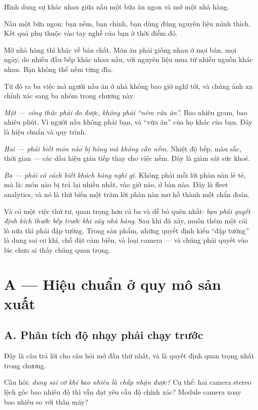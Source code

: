 \documentclass[../../vslam.tex]{subfiles}
\begin{document}
\begin{trucgiac}
Hình dung sự khác nhau giữa nấu một bữa ăn ngon và mở một nhà hàng.

Nấu một bữa ngon: bạn nếm, bạn chỉnh, bạn dùng đúng nguyên liệu mình thích. Kết quả phụ thuộc vào tay nghề của bạn ở thời điểm đó.

Mở nhà hàng thì khác về bản chất. Món ăn phải giống nhau ở mọi bàn, mọi ngày, do nhiều đầu bếp khác nhau nấu, với nguyên liệu mua từ nhiều nguồn khác nhau. Bạn không thể nếm từng đĩa.

Từ đó ra ba việc mà người nấu ăn ở nhà không bao giờ nghĩ tới, và chúng ánh xạ chính xác sang ba nhóm trong chương này.

\emph{Một --- công thức phải đo được, không phải ``nêm vừa ăn''.} Bao nhiêu gram, bao nhiêu phút. Vì người nấu không phải bạn, và ``vừa ăn'' của họ khác của bạn. Đây là hiệu chuẩn và quy trình.

\emph{Hai --- phải biết món nào bị hỏng mà không cần nếm.} Nhiệt độ bếp, màu sắc, thời gian --- các dấu hiệu gián tiếp thay cho việc nếm. Đây là giám sát sức khoẻ.

\emph{Ba --- phải có cách biết khách hàng nghĩ gì.} Không phải mỗi lời phàn nàn lẻ tẻ, mà là: món nào bị trả lại nhiều nhất, vào giờ nào, ở bàn nào. Đây là fleet analytics, và nó là thứ biến một trăm lời phàn nàn mơ hồ thành một chẩn đoán.

Và có một việc thứ tư, quan trọng hơn cả ba và dễ bỏ quên nhất: \emph{bạn phải quyết định kích thước bếp trước khi xây nhà hàng}. Sau khi đã xây, muốn thêm một cái lò nữa thì phải đập tường. Trong sản phẩm, những quyết định kiểu ``đập tường'' là dung sai cơ khí, chỗ đặt cảm biến, và loại camera --- và chúng phải quyết vào lúc chưa ai thấy chúng quan trọng.
\end{trucgiac}

\section{A --- Hiệu chuẩn ở quy mô sản xuất}

\subsection{A. Phân tích độ nhạy phải chạy trước}

Đây là câu trả lời cho câu hỏi mở đầu thứ nhất, và là quyết định quan trọng nhất trong chương.

Câu hỏi: \emph{dung sai cơ khí bao nhiêu là chấp nhận được?} Cụ thể: hai camera stereo lệch góc bao nhiêu độ thì vẫn đạt yêu cầu độ chính xác? Module camera xoay bao nhiêu so với thân máy?
\end{document}
